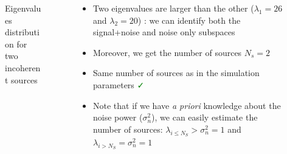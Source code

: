 \documentclass[UKenglish,8pt,aspectratio=1610]{beamer}
\begin{document}
\begin{frame}
\begin{columns}
\begin{column}{0.5\textwidth}
\begin{figure}[h!]
				\caption{Eigenvalues distribution for two incoherent sources}
			\end{figure}
		\end{column}
		\begin{column}{0.5\textwidth}
			\begin{itemize}
				\item Two eigenvalues are larger than the other ($\lambda_1=26$ and $\lambda_2=20$) : we can identify both the signal+noise and noise only subspaces
				\item Moreover, we get the number of sources $N_s=2$
				\item Same number of sources as in the simulation parameters \textcolor{green}{\faCheck}
				\item Note that if we have \textit{a priori} knowledge about the noise power ($\sigma_n^2$), we can easily estimate the number of sources: $\lambda_{i\leq N_S}>\sigma_n^2=1$ and $\lambda_{i>N_S}=\sigma_n^2=1$
			\end{itemize}
		\end{column}
	\end{columns}
	\end{frame}
\end{document}
